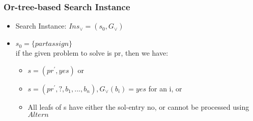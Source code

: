 \documentclass[12 pt]{article}        	%
\begin{document}
\subsubsection{Or-tree-based Search Instance}
\begin{itemize}
    \item Search Instance: $Ins_{\lor} = (s_0, G_{\lor})$
    \item $s_0 = \{partassign\}$
    \\ if the given problem to solve is pr, then we have:
    \begin{itemize}
        \item $s = (pr^{'}, yes)$ or
        \item $s = (pr^{'}, ?, b_1, ..., b_n), G_{\lor}(b_i) = yes$ for an i, or
        \item All leafs of s have either the sol-entry no, or cannot be processed using $Altern$
    \end{itemize}
\end{itemize}
\end{document}

